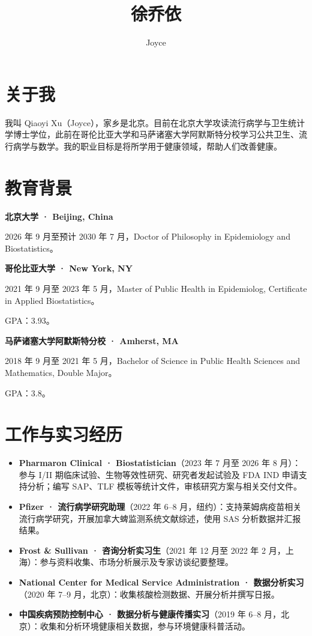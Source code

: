\documentclass[UTF8,fontset=fandol,a4paper,10pt]{ctexart}
\title{徐乔依}
\author{Joyce}
\date{}
\begin{document}
\maketitle
\section*{关于我}
我叫 Qiaoyi Xu（Joyce），家乡是北京。目前在北京大学攻读流行病学与卫生统计学博士学位，此前在哥伦比亚大学和马萨诸塞大学阿默斯特分校学习公共卫生、流行病学与数学。我的职业目标是将所学用于健康领域，帮助人们改善健康。
\section*{教育背景}
\textbf{北京大学 · Beijing, China}

2026 年 9 月至预计 2030 年 7 月，Doctor of Philosophy in Epidemiology and Biostatistics。

\textbf{哥伦比亚大学 · New York, NY}

2021 年 9 月至 2023 年 5 月，Master of Public Health in Epidemiolog, Certificate in Applied Biostatistics。

GPA：3.93。

\textbf{马萨诸塞大学阿默斯特分校 · Amherst, MA}

2018 年 9 月至 2021 年 5 月，Bachelor of Science in Public Health Sciences and Mathematics, Double Major。

GPA：3.8。

\section*{工作与实习经历}
\begin{itemize}
\item \textbf{Pharmaron Clinical · Biostatistician}（2023 年 7 月至 2026 年 8 月）：参与 I/II 期临床试验、生物等效性研究、研究者发起试验及 FDA IND 申请支持分析；编写 SAP、TLF 模板等统计文件，审核研究方案与相关交付文件。
\item \textbf{Pfizer · 流行病学研究助理}（2022 年 6–8 月，纽约）：支持莱姆病疫苗相关流行病学研究，开展加拿大蜱监测系统文献综述，使用 SAS 分析数据并汇报结果。
\item \textbf{Frost \& Sullivan · 咨询分析实习生}（2021 年 12 月至 2022 年 2 月，上海）：参与资料收集、市场分析展示及专家访谈纪要整理。
\item \textbf{National Center for Medical Service Administration · 数据分析实习}（2020 年 7–9 月，北京）：收集核酸检测数据、开展分析并撰写日报。
\item \textbf{中国疾病预防控制中心 · 数据分析与健康传播实习}（2019 年 6–8 月，北京）：收集和分析环境健康相关数据，参与环境健康科普活动。
\end{itemize}
\end{document}
